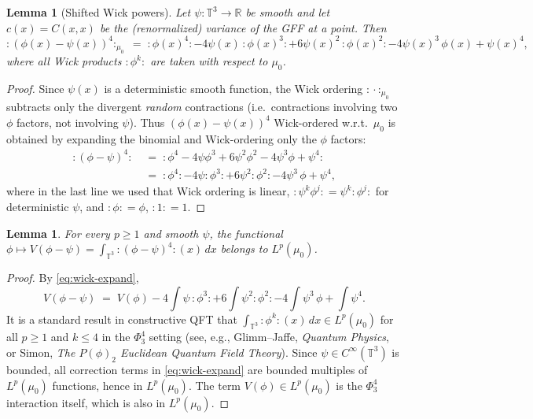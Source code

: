 \documentclass[12pt]{article}
\newtheorem{lemma}[theorem]{Lemma}
\theoremstyle{definition}
\theoremstyle{remark}
\begin{document}
\begin{lemma}[Shifted Wick powers]\label{lem:wick}
Let $\psi:\mathbb{T}^3\to\mathbb{R}$ be smooth and let $c(x) = C(x,x)$ be the
(renormalized) variance of the GFF at a point.  Then
\begin{equation}\label{eq:wick-expand}
  :\!(\phi(x)-\psi(x))^4\!:_{\mu_0}
  \;=\;
  :\!\phi(x)^4\!:
  - 4\psi(x)\,:\!\phi(x)^3\!:
  + 6\psi(x)^2\,:\!\phi(x)^2\!:
  - 4\psi(x)^3\,\phi(x)
  + \psi(x)^4,
\end{equation}
where all Wick products $:\!\phi^k\!:$ are taken with respect to $\mu_0$.
\end{lemma}

\begin{proof}
Since $\psi(x)$ is a deterministic smooth function, the Wick ordering
$:\!\cdot\!:_{\mu_0}$ subtracts only the divergent \emph{random} contractions
(i.e.\ contractions involving two $\phi$ factors, not involving $\psi$).
Thus $(\phi(x)-\psi(x))^4$ Wick-ordered w.r.t.\ $\mu_0$ is obtained by
expanding the binomial and Wick-ordering only the $\phi$ factors:
\begin{align*}
  :\!(\phi-\psi)^4\!: \;&=\; :\!\phi^4 - 4\psi\phi^3 + 6\psi^2\phi^2
                         - 4\psi^3\phi + \psi^4\!: \\
  &=\; :\!\phi^4\!: - 4\psi:\!\phi^3\!: + 6\psi^2:\!\phi^2\!:
       - 4\psi^3\,\phi + \psi^4,
\end{align*}
where in the last line we used that Wick ordering is linear, $:\!\psi^k\phi^j\!:
= \psi^k:\!\phi^j\!:$ for deterministic $\psi$, and $:\!\phi\!: = \phi$,
$:\!1\!: = 1$.
\end{proof}

\begin{lemma}\label{lem:integrability}
For every $p\ge1$ and smooth $\psi$, the functional
$\phi\mapsto V(\phi-\psi) = \int_{\mathbb{T}^3}:\!(\phi-\psi)^4\!:(x)\,dx$
belongs to $L^p(\mu_0)$.
\end{lemma}

\begin{proof}
By \eqref{eq:wick-expand},
\[
  V(\phi-\psi) \;=\; V(\phi) - 4\int\psi\,:\!\phi^3\!: + 6\int\psi^2:\!\phi^2\!:
                      - 4\int\psi^3\,\phi + \int\psi^4.
\]
It is a standard result in constructive QFT that $\int_{\mathbb{T}^3}:\!\phi^k\!:(x)\,dx
\in L^p(\mu_0)$ for all $p\ge1$ and $k\le4$ in the $\Phi^4_3$ setting
(see, e.g., Glimm--Jaffe, \emph{Quantum Physics}, or Simon,
\emph{The $P(\phi)_2$ Euclidean Quantum Field Theory}).
Since $\psi\in C^\infty(\mathbb{T}^3)$ is bounded, all correction terms in
\eqref{eq:wick-expand} are bounded multiples of $L^p(\mu_0)$ functions, hence
in $L^p(\mu_0)$.  The term $V(\phi)\in L^p(\mu_0)$ is the $\Phi^4_3$
interaction itself, which is also in $L^p(\mu_0)$.
\end{proof}
\end{document}
